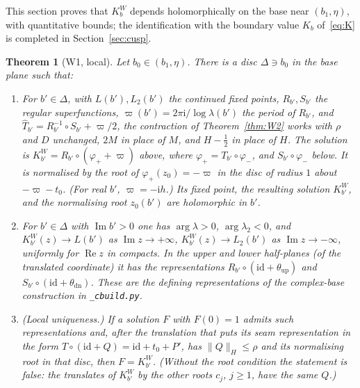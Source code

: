 \documentclass[11pt]{amsart}
\newtheorem{theorem}{Theorem}[section]
\theoremstyle{definition}
\newcommand{\Rr}{R}
\newcommand{\Kk}{K}
\newcommand{\ii}{\mathrm{i}}
\begin{document}
This section proves that $\Kk^W_b$ depends holomorphically on the base near
$(b_1,\eta)$, with quantitative bounds; the identification with the boundary
value $\Kk_b$ of~\eqref{eq:K} is completed in Section~\ref{sec:cusp}.

\begin{theorem}[W1, local]\label{thm:W1}
Let $b_0\in(b_1,\eta)$.  There is a disc $\Delta\ni b_0$ in the base plane such
that:
\begin{enumerate}
\item For $b'\in\Delta$, with $L(b'),L_2(b')$ the continued fixed points,
  $\Rr_{b'},S_{b'}$ the regular superfunctions, $\varpi(b')=2\pi\ii/\log\lambda(b')$
  the period of $\Rr_{b'}$, and $\hat T_{b'}=\Rr_{b'}^{-1}\circ S_{b'}+\varpi/2$,
  the contraction of Theorem~\ref{thm:W2} works with $\rho$ and $D$
  unchanged, $2M$ in place of $M$, and $H-\tfrac12$ in place of $H$.  The solution is
  $\Kk^W_{b'}=\Rr_{b'}\circ(\varphi_++\varpi)$ above, where
  $\varphi_+=T_{b'}\circ\varphi_-$, and $S_{b'}\circ\varphi_-$ below.  It is
  normalised by the root of $\varphi_+(z_0)=-\varpi$ in the disc of radius $1$
  about $-\varpi-t_0$.  (For real $b'$, $\varpi=-\ii h$.)
  Its fixed point, the resulting solution $\Kk^W_{b'}$, and the normalising root
  $z_0(b')$ are holomorphic in $b'$.
\item For $b'\in\Delta$ with $\operatorname{Im}b'>0$ one has $\arg\lambda>0$,
  $\arg\lambda_2<0$, and $\Kk^W_{b'}(z)\to L(b')$ as $\operatorname{Im}z\to+\infty$,
  $\Kk^W_{b'}(z)\to L_2(b')$ as $\operatorname{Im}z\to-\infty$, uniformly for
  $\operatorname{Re}z$ in compacts.  In the upper and lower half-planes (of
  the translated coordinate) it has the representations
  $\Rr_{b'}\circ(\mathrm{id}+\theta_{\mathrm{up}})$ and
  $S_{b'}\circ(\mathrm{id}+\theta_{\mathrm{dn}})$.  These are the defining
  representations of the complex-base construction in \texttt{\_cbuild.py}.
\item (Local uniqueness.)  If a solution $F$ with $F(0)=1$ admits such
  representations and, after the translation that puts its seam
  representation in the form $T\circ(\mathrm{id}+Q)=\mathrm{id}+t_0+P'$, has
  $\|Q\|_H\le\rho$ and its normalising root in that disc, then
  $F=\Kk^W_{b'}$.  (Without the root condition the statement is false: the
  translates of $\Kk^W_{b'}$ by the other roots $c_j$, $j\ge1$, have the same $Q$.)
\end{enumerate}
\end{theorem}
\end{document}
